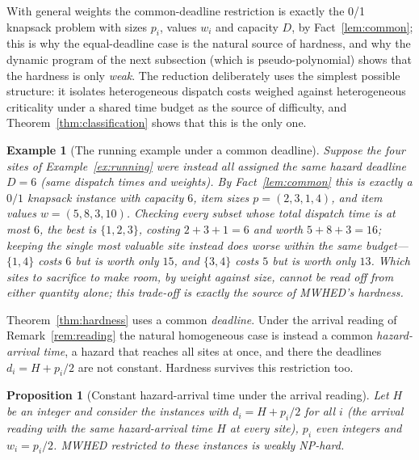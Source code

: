 \documentclass[pdflatex,sn-mathphys-ay]{sn-jnl}
\theoremstyle{thmstyleone}
\newtheorem{proposition}[theorem]{Proposition}
\theoremstyle{thmstyletwo}
\theoremstyle{thmstylethree}
\newtheorem{example}{Example}
\begin{document}
With general weights the common-deadline restriction is exactly the 0/1
knapsack problem with sizes $p_i$, values $w_i$ and capacity $D$, by
Fact~\ref{lem:common}; this is why the equal-deadline case is the
natural source of hardness, and why the dynamic program of the next
subsection (which is pseudo-polynomial) shows that the hardness is only
\emph{weak}. The reduction deliberately uses the simplest possible
structure: it isolates heterogeneous dispatch costs weighed against
heterogeneous criticality under a shared time budget as the source of
difficulty, and Theorem~\ref{thm:classification} shows that this is the
only one.

\begin{example}[The running example under a common deadline]\label{ex:knapsack}
Suppose the four sites of Example~\ref{ex:running} were instead all
assigned the same hazard deadline $D=6$ (same dispatch times and
weights). By Fact~\ref{lem:common} this is exactly a $0/1$ knapsack
instance with capacity $6$, item sizes $p=(2,3,1,4)$, and item values
$w=(5,8,3,10)$. Checking every subset whose total dispatch time is at
most $6$, the best is $\{1,2,3\}$, costing $2+3+1=6$ and worth
$5+8+3=16$; keeping the single most valuable site instead does worse
within the same budget---$\{1,4\}$ costs $6$ but is worth only $15$, and
$\{3,4\}$ costs $5$ but is worth only $13$. Which sites to sacrifice to
make room, by weight against size, cannot be read off from either
quantity alone; this trade-off is exactly the source of MWHED's
hardness.
\end{example}

Theorem~\ref{thm:hardness} uses a common \emph{deadline}. Under the
arrival reading of Remark~\ref{rem:reading} the natural homogeneous case
is instead a common \emph{hazard-arrival time}, a hazard that reaches all
sites at once, and there the deadlines $d_i=H+p_i/2$ are not constant.
Hardness survives this restriction too.

\begin{proposition}[Constant hazard-arrival time under the arrival reading]\label{prop:consth}
Let $H$ be an integer and consider the instances with $d_i=H+p_i/2$ for
all $i$ (the arrival reading with the same hazard-arrival time $H$ at
every site), $p_i$ even integers and $w_i=p_i/2$. MWHED restricted to
these instances is weakly NP-hard.
\end{proposition}
\end{document}
